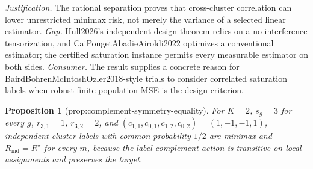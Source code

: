 \documentclass{article}
\newtheorem{proposition}{Proposition}
\begin{document}
\par\smallskip\noindent \textit{Justification.} The rational separation proves that cross-cluster correlation can lower unrestricted minimax risk, not merely the variance of a selected linear estimator. \textit{Gap.} Hull2026's independent-design theorem relies on a no-interference tensorization, and CaiPougetAbadieAiroldi2022 optimizes a conventional estimator; the certified saturation instance permits every measurable estimator on both sides. \textit{Consumer.} The result supplies a concrete reason for BairdBohrenMcIntoshOzler2018-style trials to consider correlated saturation labels when robust finite-population MSE is the design criterion.

\begin{proposition}[prop:complement-symmetry-equality]\label{prop:complement-symmetry-equality}
For \(K=2\), \(s_g=3\) for every \(g\), \(r_{3,1}=1\), \(r_{3,2}=2\), and \((c_{1,1},c_{0,1},c_{1,2},c_{0,2})=(1,-1,-1,1)\), independent cluster labels with common probability \(1/2\) are minimax and \(R_{\mathrm{ind}}=R^\star\) for every \(m\), because the label-complement action is transitive on local assignments and preserves the target.
\end{proposition}
\end{document}
